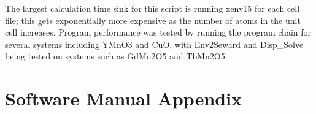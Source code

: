 \documentclass[10pt]{article}
\begin{document}
The largest calculation time sink for this script is running xenv15 for each cell file; this gets exponentially more expensive as the number of atoms in the unit cell increases. Program performance was tested by running the program chain for several systems including YMnO3 and CuO, with Env2Seward and Disp\_Solve being tested on systems such as GdMn2O5 and TbMn2O5.

\newpage
\section*{Software Manual Appendix}




\end{document}
